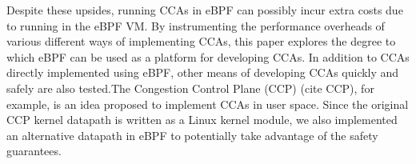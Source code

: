 \documentclass[../main.tex]{subfiles}
\begin{document}
Despite these upsides, running CCAs in eBPF can possibly incur extra costs due to running in the eBPF VM. By instrumenting the performance overheads of various different ways of implementing CCAs, this paper explores the degree to which eBPF can be used as a platform for developing CCAs. In addition to CCAs directly implemented using eBPF, other means of developing CCAs quickly and safely are also tested.The Congestion Control Plane (CCP) (cite CCP), for example, is an idea proposed to implement CCAs in user space. Since the original CCP kernel datapath is written as a Linux kernel module, we also implemented an alternative datapath in eBPF to potentially take advantage of the safety guarantees.
\end{document}

